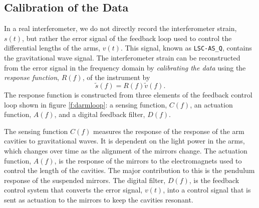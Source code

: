 \subsection{Calibration of the Data}
\label{ss:calibration}

In a real interferometer, we do not directly record the interferometer strain,
$s(t)$, but rather the error signal of the feedback loop used to control the
differential lengths of the arms, $v(t)$. This signal, known as
\texttt{LSC-AS\_Q}, contains the gravitational wave signal. The interferometer
strain can be reconstructed from the error signal in the frequency domain by
\emph{calibrating the data} using the \emph{response function}, $R(f)$, of the
instrument by
\begin{equation}
\tilde{s}(f) = R(f) \tilde{v}(f).
\end{equation}
The response function is constructed from three elements of the feedback
control loop shown in figure \ref{f:darmloop}: a sensing function, $C(f)$, an
actuation function, $A(f)$, and a digital feedback filter,
$D(f)$\cite{Gonzalez:2002}. 

The sensing function $C(f)$ measures the response of the response of the arm
cavities to gravitational waves. It is dependent on the light power in the arms,
which changes over time as the alignment of the mirrors change.  The actuation
function, $A(f)$, is the response of the mirrors to the electromagnets used to
control the length of the cavities. The major contribution to this is the
pendulum response of the suspended mirrors.  The digital filter, $D(f)$, is
the feedback control system that converts the error signal, $v(t)$, into a
control signal that is sent as actuation to the mirrors to keep the cavities
resonant.

